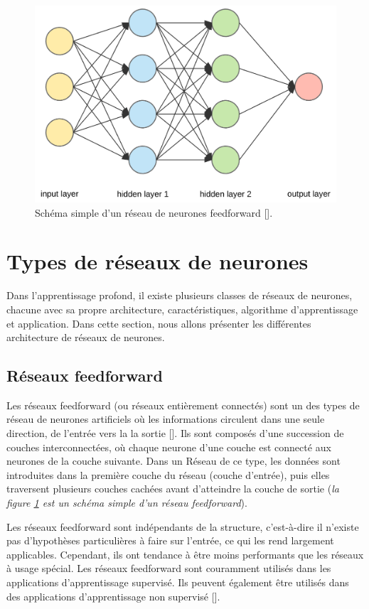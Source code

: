 \medskip

\begin{figure}[hbt!]
	\centering
	\includegraphics[width=12cm]{images_pfe/network.png}
	\caption{Schéma simple d'un réseau de neurones feedforward [\cite{dl-healthcare}].}
	\label{fig:schema-reseau}
\end{figure}
\FloatBarrier
\medskip

\section{Types de réseaux de neurones}
Dans l'apprentissage profond, il existe plusieurs classes de réseaux de
neurones, chacune avec sa propre architecture, caractéristiques, algorithme
d'apprentissage et application. Dans cette section, nous allons présenter les
différentes architecture de réseaux de neurones.
\subsection{Réseaux feedforward}
Les réseaux feedforward (ou réseaux entièrement connectés) sont un des types de
réseau de neurones artificiels où les informations circulent dans une seule
direction, de l'entrée vers la la sortie [\cite{Goodfellow-et-al-2016}]. Ils
sont composés d'une succession de couches interconnectées, où chaque neurone
d'une couche est connecté aux neurones de la couche suivante. Dans un Réseau de
ce type, les données sont introduites dans la première couche du réseau (couche
d'entrée), puis elles traversent plusieurs couches cachées avant d'atteindre la
couche de sortie (\textit{la figure \ref{fig:schema-reseau} est un schéma
	simple d'un réseau feedforward}).

Les réseaux feedforward sont indépendants de la structure, c’est-à-dire il
n’existe pas d’hypothèses particulières à faire sur l’entrée, ce qui les rend
largement applicables. Cependant, ils ont tendance à être moins performants que
les réseaux à usage spécial. Les réseaux feedforward sont couramment utilisés
dans les applications d'apprentissage supervisé. Ils peuvent également être
utilisés dans des applications d'apprentissage non supervisé
[\cite{aggarwal_2018}].


